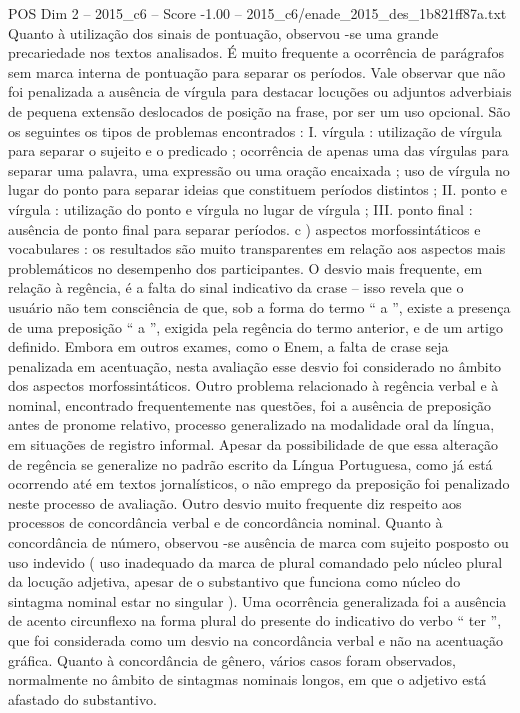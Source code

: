 \begin{textsample}{POS Dim 2 – 2015\_c6 – Score -1.00 – 2015\_c6/enade\_2015\_des\_1b821ff87a.txt}
Quanto à utilização dos sinais de pontuação, observou -se uma grande precariedade nos textos analisados.
É muito frequente a ocorrência de parágrafos sem marca interna de pontuação para separar os períodos.
Vale observar que não foi penalizada a ausência de vírgula para destacar locuções ou adjuntos adverbiais de pequena extensão deslocados de posição na frase, por ser um uso opcional.
São os seguintes os tipos de problemas encontrados : I. vírgula : utilização de vírgula para separar o sujeito e o predicado ; ocorrência de apenas uma das vírgulas para separar uma palavra, uma expressão ou uma oração encaixada ; uso de vírgula no lugar do ponto para separar ideias que constituem períodos distintos ; II. ponto e vírgula : utilização do ponto e vírgula no lugar de vírgula ; III. ponto final : ausência de ponto final para separar períodos. c ) aspectos morfossintáticos e vocabulares : os resultados são muito transparentes em relação aos aspectos mais problemáticos no desempenho dos participantes.
O desvio mais frequente, em relação à regência, é a falta do sinal indicativo da crase – isso revela que o usuário não tem consciência de que, sob a forma do termo “ a ”, existe a presença de uma preposição “ a ”, exigida pela regência do termo anterior, e de um artigo definido.
Embora em outros exames, como o Enem, a falta de crase seja penalizada em acentuação, nesta avaliação esse desvio foi considerado no âmbito dos aspectos morfossintáticos.
Outro problema relacionado à regência verbal e à nominal, encontrado frequentemente nas questões, foi a ausência de preposição antes de pronome relativo, processo generalizado na modalidade oral da língua, em situações de registro informal.
Apesar da possibilidade de que essa alteração de regência se generalize no padrão escrito da Língua Portuguesa, como já está ocorrendo até em textos jornalísticos, o não emprego da preposição foi penalizado neste processo de avaliação.
Outro desvio muito frequente diz respeito aos processos de concordância verbal e de concordância nominal.
Quanto à concordância de número, observou -se ausência de marca com sujeito posposto ou uso indevido ( uso inadequado da marca de plural comandado pelo núcleo plural da locução adjetiva, apesar de o substantivo que funciona como núcleo do sintagma nominal estar no singular ).
Uma ocorrência generalizada foi a ausência de acento circunflexo na forma plural do presente do indicativo do verbo “ ter ”, que foi considerada como um desvio na concordância verbal e não na acentuação gráfica.
Quanto à concordância de gênero, vários casos foram observados, normalmente no âmbito de sintagmas nominais longos, em que o adjetivo está afastado do substantivo.

\end{textsample}
